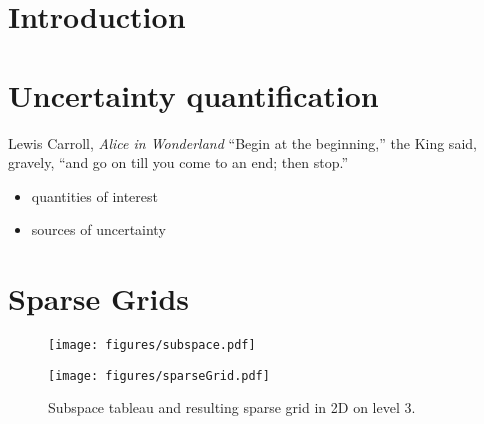 
\chapter{Introduction}
\label{cha:introduction}


\chapter{Uncertainty quantification}
\label{sec:uncert-quant}

\begin{chapquote}{Lewis Carroll, \textit{Alice in Wonderland}}
  ``Begin at the beginning,'' the King said, gravely, ``and go on till you
  come to an end; then stop.''
\end{chapquote}

\begin{itemize}
\item quantities of interest
\item sources of uncertainty
\end{itemize}

\blindtext
\blindtext
\blindtext
\blindtext
\blindtext
\blindtext
\blindtext
\blindtext
\blindtext
\blindtext
\blindtext
\blindtext
\blindtext
\blindtext
\blindtext
\blindtext

\chapter{Sparse Grids}
\label{cha:sparse-grids}

\begin{figure}
\centering
\begin{minipage}{0.48\textwidth}
\texttt{[image: figures/subspace.pdf]}
\end{minipage}
\begin{minipage}{0.48\textwidth}
\texttt{[image: figures/sparseGrid.pdf]}
\end{minipage}
\caption{Subspace tableau and resulting sparse grid in 2D on level 3.}
\end{figure}

\cite{zenger91sparse}
\cite{zenger91sparse, Adams12Rigorous}


